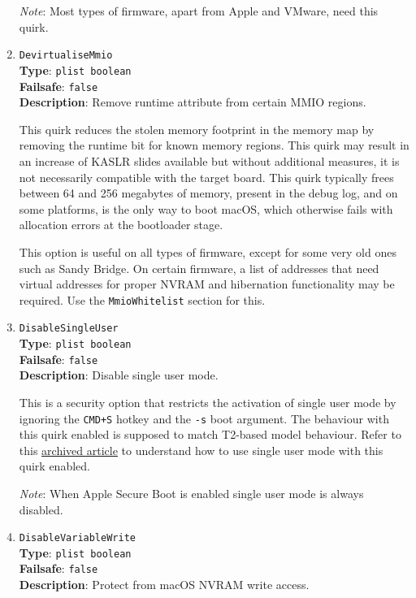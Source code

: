 \documentclass[]{article}
\begin{document}
\begin{enumerate}
  \emph{Note}: Most types of firmware, apart from Apple and VMware, need this quirk.

\item
  \texttt{DevirtualiseMmio}\\
  \textbf{Type}: \texttt{plist\ boolean}\\
  \textbf{Failsafe}: \texttt{false}\\
  \textbf{Description}: Remove runtime attribute from certain MMIO regions.

  This quirk reduces the stolen memory footprint in the memory map by removing
  the runtime bit for known memory regions. This quirk may result in an increase
  of KASLR slides available but without additional measures, it is not necessarily
  compatible with the target board. This quirk typically frees between 64 and 256
  megabytes of memory, present in the debug log, and on some platforms, is the only way
  to boot macOS, which otherwise fails with allocation errors at the bootloader stage.

  This option is useful on all types of firmware, except for some very old
  ones such as Sandy Bridge. On certain firmware, a list of addresses that need
  virtual addresses for proper NVRAM and hibernation functionality may be required.
  Use the \texttt{MmioWhitelist} section for this.

\item
  \texttt{DisableSingleUser}\\
  \textbf{Type}: \texttt{plist\ boolean}\\
  \textbf{Failsafe}: \texttt{false}\\
  \textbf{Description}: Disable single user mode.

  This is a security option that restricts the activation of single user mode
  by ignoring the \texttt{CMD+S} hotkey and the \texttt{-s} boot argument. The
  behaviour with this quirk enabled is supposed to match T2-based model behaviour.
  Refer to this
  \href{https://web.archive.org/web/20200517125051/https://support.apple.com/en-us/HT201573}{archived article}
  to understand how to use single user mode with this quirk enabled.

  \emph{Note}: When Apple Secure Boot is enabled single user mode is always disabled.

\item
  \texttt{DisableVariableWrite}\\
  \textbf{Type}: \texttt{plist\ boolean}\\
  \textbf{Failsafe}: \texttt{false}\\
  \textbf{Description}: Protect from macOS NVRAM write access.


\end{enumerate}
\end{document}
